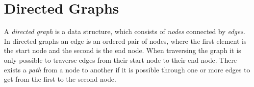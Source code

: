 	
	
	
	
	
	
			
	\section{Directed Graphs}
	A \textit{directed graph} is a data structure, which consists of \textit{nodes} connected by \textit{edges}. In directed graphs an edge is an ordered pair of nodes, where the first element is the start node and the second is the end node. When traversing the graph it is only possible to traverse edges from their start node to their end node. There exists a \textit{path} from a node to another if it is possible through one or more edges to get from the first to the second node.
	
